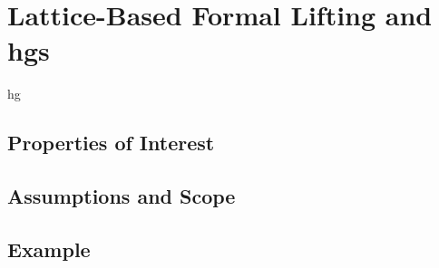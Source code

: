\chapter{Lattice-Based Formal Lifting and \aclp*{hg}}\label{ch:hg-lifting}

\Ac{hg}

\section{Properties of Interest}

\section{Assumptions and Scope}

\section{Example}
